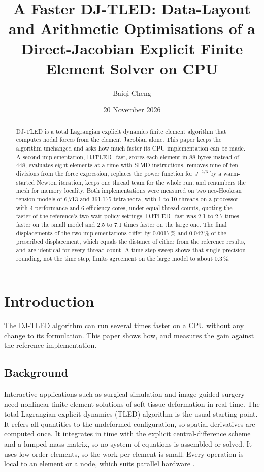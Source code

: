 \documentclass[11pt,a4paper]{article}
\title{\textbf{A Faster DJ-TLED: Data-Layout and Arithmetic Optimisations of a Direct-Jacobian Explicit Finite Element Solver on CPU}}
\author{Baiqi Cheng}
\date{20 November 2026}
\newcommand{\DJF}{DJTLED\_fast}
\newcommand{\Jm}{J^{-2/3}}
\begin{document}
\maketitle

\begin{abstract}
\noindent
DJ-TLED is a total Lagrangian explicit dynamics finite element algorithm that computes nodal forces from the element Jacobian alone. This paper keeps the algorithm unchanged and asks how much faster its CPU implementation can be made. A second implementation, \DJF, stores each element in 88 bytes instead of 448, evaluates eight elements at a time with SIMD instructions, removes nine of ten divisions from the force expression, replaces the power function for $\Jm$ by a warm-started Newton iteration, keeps one thread team for the whole run, and renumbers the mesh for memory locality. Both implementations were measured on two neo-Hookean tension models of 6,713 and 361,175 tetrahedra, with 1 to 10 threads on a processor with 4 performance and 6 efficiency cores, under equal thread counts, quoting the faster of the reference's two wait-policy settings. \DJF{} was 2.1 to 2.7 times faster on the small model and 2.5 to 7.1 times faster on the large one. The final displacements of the two implementations differ by 0.0017\,\% and 0.042\,\% of the prescribed displacement, which equals the distance of either from the reference results, and are identical for every thread count. A time-step sweep shows that single-precision rounding, not the time step, limits agreement on the large model to about 0.3\,\%.
\end{abstract}

\section{Introduction}
\label{sec:intro}

The DJ-TLED algorithm can run several times faster on a CPU without any change to its formulation. This paper shows how, and measures the gain against the reference implementation.

\subsection{Background}

Interactive applications such as surgical simulation and image-guided surgery need nonlinear finite element solutions of soft-tissue deformation in real time. The total Lagrangian explicit dynamics (TLED) algorithm \cite{miller2007} is the usual starting point. It refers all quantities to the undeformed configuration, so spatial derivatives are computed once. It integrates in time with the explicit central-difference scheme and a lumped mass matrix, so no system of equations is assembled or solved. It uses low-order elements, so the work per element is small. Every operation is local to an element or a node, which suits parallel hardware \cite{taylor2008}.
\end{document}
